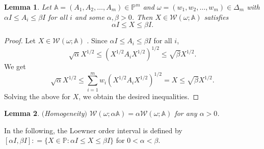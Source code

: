 \documentclass[12pt,reqno]{amsart}
\newtheorem{theorem}{Theorem}[section]
\newtheorem{lemma}[theorem]{Lemma}
\begin{document}
\begin{lemma} \label{ineq}
Let $\mathbb{A} = (A_1, A_2, \ldots, A_m) \in \mathbb{P}^{m}$ and $\omega = (w_{1}, w_{2}, \dots, w_{m}) \in \Delta_{m}$ with $\alpha I \leq A_i \leq \beta I $ for all $i$ and some $\alpha, \beta > 0$. Then $X \in \mathcal{W}(\omega; \mathbb{A})$ satisfies
\begin{displaymath}
\alpha I \leq X \leq \beta I.
\end{displaymath}
\end{lemma}

\begin{proof}
Let $X \in \mathcal{W}(\omega; \mathbb{A})$ . Since $\alpha I \leq A_{i} \leq \beta I$ for all $i$,
\begin{displaymath}
\sqrt{\alpha} X^{1/2} \leq (X^{1/2} A_{i} X^{1/2})^{1/2} \leq \sqrt{\beta} X^{1/2}.
\end{displaymath}
We get
\begin{displaymath}
\sqrt{\alpha} X^{1/2} \leq \sum_{i=1}^{m} w_{i} (X^{1/2} A_{i} X^{1/2})^{1/2} = X \leq \sqrt{\beta} X^{1/2}.
\end{displaymath}
Solving the above for $X$, we obtain the desired inequalities.
\end{proof}

\begin{lemma} \label{homo_set} $($Homogeneity$)$
$\mathcal{W}(\omega; \alpha\mathbb{A})= \alpha \mathcal{W}(\omega; \mathbb{A})$ for any $\alpha > 0$.
\end{lemma}


In the following, the Loewner order interval is defined by
$ [\alpha I, \beta I] : = \{ X \in \mathbb{P}: \alpha I \leq X \leq \beta I \} $
for $0< \alpha< \beta $.

%
\end{document}

